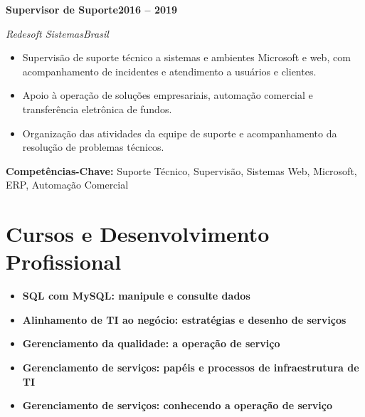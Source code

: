 \documentclass[a4paper,11pt]{article}
\newlength{\cventrysep}\setlength{\cventrysep}{6pt}
\newcommand{\cvsection}[1]{\section{#1}}
\newcommand{\cventry}[4]{%
  \Needspace{7\baselineskip}
  \noindent\normalsize\textbf{#1}\hfill\small\textbf{#4}\par
  \nopagebreak[4]
  \noindent\normalsize\textit{\textcolor{accent}{#2}}\hfill\small\textit{#3}\par
  \nopagebreak[4]
}
\newcommand{\keytech}[1]{\small\textbf{Competências-Chave:} #1\par}
\begin{document}
\vspace{\cventrysep}

\cventry{Supervisor de Suporte}{Redesoft Sistemas}{Brasil}{2016 -- 2019}
\begin{itemize}\small
  \item Supervisão de suporte técnico a sistemas e ambientes Microsoft e web, com acompanhamento de incidentes e atendimento a usuários e clientes.
  \item Apoio à operação de soluções empresariais, automação comercial e transferência eletrônica de fundos.
  \item Organização das atividades da equipe de suporte e acompanhamento da resolução de problemas técnicos.
\end{itemize}
\keytech{Suporte Técnico, Supervisão, Sistemas Web, Microsoft, ERP, Automação Comercial}

\vspace{\cventrysep}

\cvsection{Cursos e Desenvolvimento Profissional}
\begin{itemize}\small
  \item \textbf{SQL com MySQL: manipule e consulte dados}
  \item \textbf{Alinhamento de TI ao negócio: estratégias e desenho de serviços}
  \item \textbf{Gerenciamento da qualidade: a operação de serviço}
  \item \textbf{Gerenciamento de serviços: papéis e processos de infraestrutura de TI}
  \item \textbf{Gerenciamento de serviços: conhecendo a operação de serviço}
\end{itemize}
\end{document}
